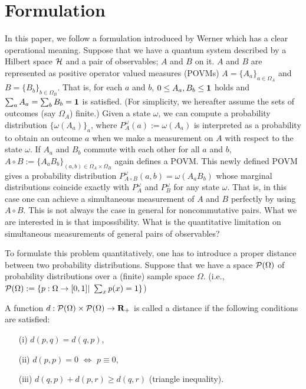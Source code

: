 \documentclass[showpacs,preprintnumbers,amsmath,amssymb]{revtex4}
\begin{document}
\section{Formulation}\label{sec:formulation}
In this paper, we follow a formulation introduced by Werner \cite{Werner}
which has a clear operational meaning. 
Suppose that we have a quantum system described by a Hilbert space 
${\cal H}$ and 
a pair of observables;
$A$ and $B$ on it. 
$A$ and $B$ are
represented as positive operator 
valued measures (POVMs) $A=\{A_a\}_{a \in \Omega_A}$ and 
$B=\{B_b\}_{b \in \Omega_B}$.
 That is,  
for each $a$ and $b$, $0\leq A_a, B_b\leq {\bf 1}$ holds and 
$\sum_a A_a =\sum_b B_b ={\bf 1}$ is satisfied. 
(For simplicity, we hereafter assume the sets of outcomes (say $\Omega_A$) 
finite.)
Given a state $\omega$, we can compute a probability distribution 
$\{\omega(A_a)\}_a$, where $P^{\omega}_{A}(a):=\omega(A_a)$
 is interpreted as a probability to 
obtain an outcome $a$ when we make a measurement on $A$ with 
respect to the state $\omega$. 
If $A_a$ and $B_b$ commute with each other for all $a$ and $b$, 
$A\circ B:=\{A_a B_b\}_{(a,b) \in \Omega_A \times \Omega_B}$ 
again defines a POVM. 
This newly defined POVM gives a probability distribution 
$P^{\omega}_{A\circ B}(a,b)=\omega(A_aB_b)$ whose marginal distributions 
coincide exactly with 
$P^{\omega}_{A}$ and $P^{\omega}_B$ for any state $\omega$. 
That is, in this case one can achieve a simultaneous measurement 
of $A$ and $B$ perfectly by using $A\circ B$. 
This is not always the case in general for noncommutative pairs. 
What we are interested in is that impossibility. 
What is the quantitative limitation on simultaneous measurements 
of general pairs of observables? 
\par
To formulate this problem quantitatively, one has to 
introduce a proper distance between two probability distributions. 
Suppose that we have a space ${\cal P}(\Omega)$ 
of probability distributions 
over a (finite) sample space $\Omega$. 
(i.e., ${\cal P}(\Omega):=\{p:\Omega \to [0,1]|\ \sum_x p(x)=1\}$)
\par
A function $d: {\cal P}(\Omega) \times {\cal P}(\Omega)
\to {\bf R}_{+}$ is called a distance if the following conditions are 
satisfied: 
\begin{itemize}
\item[(i)] $d(p,q)=d(q,p)$,
\item[(ii)]$d(p,p)=0$ $\Leftrightarrow$ $p\equiv 0$,
\item[(iii)] $d(q,p)+d(p,r)\geq d(q,r)$ (triangle inequality). 
\end{itemize}
\end{document}
